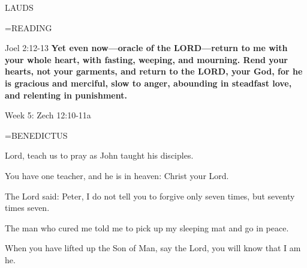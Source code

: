 \begin{flushleft}\normalsize LAUDS\\\end{flushleft}
\hangindent=\parindent \small READING
\begin{description}[labelindent=\parindent, leftmargin=*]
\item [Weeks 1-4:]     Joel 2:12-13 \textbf{    Yet even now—oracle of the LORD—return to me with your whole heart, with fasting, weeping, and mourning. Rend your hearts, not your garments, and return to the LORD, your God, for he is gracious and merciful, slow to anger, abounding in steadfast love, and relenting in punishment.\\}
\end{description}

Week 5:    Zech 12:10-11a    

\hangindent=\parindent \small BENEDICTUS
\begin{description}[labelindent=\parindent, leftmargin=*]
\item [Week 1:] 	Lord, teach us to pray as John taught his disciples.
\item [Week 2:] 	You have one teacher, and he is in heaven: Christ your Lord.
\item [Week 3:] 	The Lord said: Peter, I do not tell you to forgive only seven times, but seventy times seven.
\item [Week 4:] 	The man who cured me told me to pick up my sleeping mat and go in peace.
\item [Week 5:] 	When you have lifted up the Son of Man, say the Lord, you will know that I am he.
\end{description}

